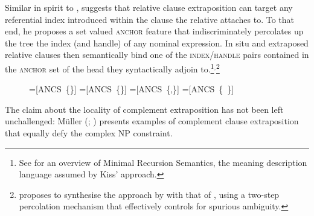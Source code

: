 \documentclass[output=paper
                ,modfonts
                ,nonflat
	        ,collection
	        ,collectionchapter
	        ,collectiontoclongg
 	        ,biblatex
                ,babelshorthands
                ,newtxmath
                ,draftmode
                ,colorlinks, citecolor=brown
]{./langsci/langscibook}
\begin{document}
{Similar in spirit to \citet{culicover90:_extrap_and_compl_princ},
\citet{kiss_t02nllt} suggests that relative clause extraposition can
target any referential index introduced within the clause the relative
attaches to.  To that end, he proposes a set valued \textsc{anchor}
feature that indiscriminately percolates up the tree the index (and
handle) of any nominal expression. In situ and extraposed relative
clauses then semantically bind one of the \textsc{index/handle} pairs
contained in the \textsc{anchor} set of the head they syntactically
adjoin to.\footnote{See 
for an overview of Minimal Recursion Semantics, the meaning
description language assumed by Kiss' approach.}$^,$\footnote{\citet{crysmann_b04rlc} proposes to synthesise the
  approach by \citet{kiss_t02nllt} with that of \citet{Keller:95},
  using a two-step percolation mechanism that effectively controls for
  spurious ambiguity.} 

\begin{figure}
  
  { \newbox\onebox \newbox\twobox \newbox\onetwobox \newbox\emptybox

    \setbox\onebox=\hbox{[\textsc{ANCS} \{\}]}
    \setbox\twobox=\hbox{[\textsc{ANCS} \{\}]}
    \setbox\onetwobox=\hbox{[\textsc{ANCS} \{,\}]}
    \setbox\emptybox=\hbox{[\textsc{ANCS} \{ \}]}

    
}




\end{figure}

The claim about the locality of complement extraposition has not been
left unchallenged: Müller (\citeyear[]{Mueller99a}; \citeyear[]{Mueller2004d}) presents examples of complement clause
extraposition that equally defy the complex NP constraint.

 \begin{exe}
  \ex 
  \begin{xlist}
    

\end{xlist}
\end{exe}}
\end{document}
